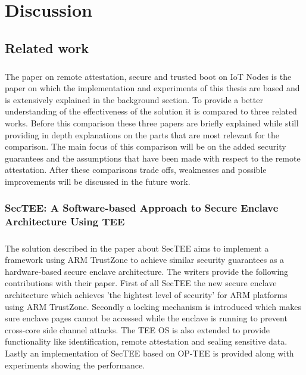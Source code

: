 \chapter{Discussion}

\section{Related work}

\paragraph*{}
The paper on remote attestation, secure and trusted boot on IoT Nodes \cite{LingZhen2021Sbtb} is the paper on which the implementation and experiments of this thesis are based and is extensively explained in the background section. To provide a better understanding of the effectiveness of the solution it is compared to three related works. Before this comparison these three papers are briefly explained while still providing in depth explanations on the parts that are most relevant for the comparison. The main focus of this comparison will be on the added security guarantees and the assumptions that have been made with respect to the remote attestation. After these comparisons trade offs, weaknesses and possible improvements will be discussed in the future work.

\subsection*{SecTEE: A Software-based Approach to Secure Enclave Architecture Using TEE}

\paragraph*{}
The solution described in the paper about SecTEE \cite{ZhaoShijun2019SASA} aims to implement a framework using ARM TrustZone to achieve similar security guarantees as a hardware-based secure enclave architecture. The writers provide the following contributions with their paper. First of all SecTEE the new secure enclave architecture which achieves 'the hightest level of security' for ARM platforms using ARM TrustZone. Secondly a locking mechanism is introduced which makes sure enclave pages cannot be accessed while the enclave is running to prevent cross-core side channel attacks. The TEE OS is also extended to provide functionality like identification, remote attestation and sealing sensitive data. Lastly an implementation of SecTEE based on OP-TEE is provided along with experiments showing the performance. 


